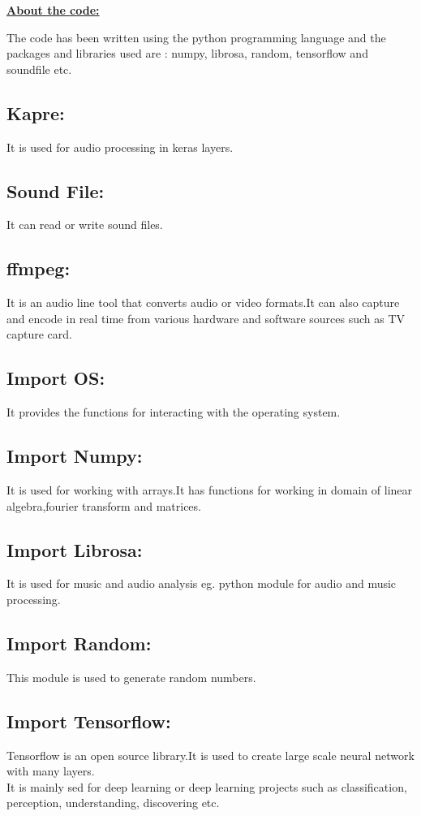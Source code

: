 \documentclass[a4paper,12pt]{article}
\begin{document}
	\textbf{\underline{About the code:}}
	
	The code has been written using the python programming language and the packages and libraries used are : numpy, librosa, random, tensorflow and soundfile etc.
	
	
	\subsection{Kapre:} It is used for audio processing in keras layers.
	
	
	
	\subsection{Sound File:}It can read or write sound files.
	
	\subsection{ffmpeg:} It is an audio line tool that converts audio or video formats.It can also capture and encode in real time from various hardware and software sources such as TV capture card.
	
	
	\subsection{Import OS:} It provides the functions for interacting with the operating system.
	
	\subsection{Import Numpy:} It is used for working with arrays.It has functions for working in domain of linear algebra,fourier transform and matrices.
	
	
	\subsection{Import Librosa:} It is used for music and audio analysis eg. python module for audio and music processing.
	
	\subsection{Import Random:} This module is used to generate random numbers.
	
	\subsection{Import Tensorflow:} Tensorflow is an open source library.It is used to create large scale  neural network with many layers.\\
	It is mainly sed for deep learning or deep learning projects such as classification, perception, understanding, discovering etc.\\
	
\end{document}
